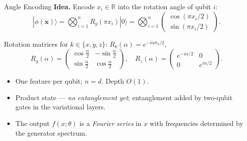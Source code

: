 \documentclass[aspectratio=169,11pt]{beamer}
\newcommand{\R}{\mathbb{R}}
\newcommand{\bx}{\mathbf{x}}
\begin{document}
\begin{frame}{Angle Encoding}
  \textbf{Idea.} Encode $x_i\in\R$ into the rotation angle of qubit $i$:
  \[
    |\phi(\bx)\rangle
    = \bigotimes_{i=1}^{n} R_y(\pi x_i)|0\rangle
    = \bigotimes_{i=1}^{n}
      \begin{pmatrix}\cos(\pi x_i/2)\\ \sin(\pi x_i/2)\end{pmatrix}.
  \]

  \medskip
  Rotation matrices for $k\in\{x,y,z\}$:
  $R_k(\alpha) = e^{-i\alpha\sigma_k/2}$,
  \[
    R_y(\alpha)=\begin{pmatrix}\cos\frac\alpha2 & -\sin\frac\alpha2\\
                               \sin\frac\alpha2 &  \cos\frac\alpha2
               \end{pmatrix},
    \quad
    R_z(\alpha)=\begin{pmatrix}e^{-i\alpha/2}&0\\0&e^{i\alpha/2}
               \end{pmatrix}.
  \]

  \medskip
  \begin{itemize}
    \item One feature per qubit; $n=d$.  Depth $O(1)$.
    \item Product state --- \emph{no entanglement yet}; entanglement
          added by two-qubit gates in the variational layers.
    \item The output $f(x;\theta)$ is a \emph{Fourier series} in $x$
          with frequencies determined by the generator spectrum.
  \end{itemize}
\end{frame}
\end{document}
